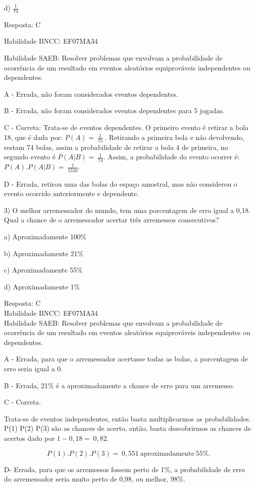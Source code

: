 d) \(\frac{1}{74}\)

Resposta: C

Habilidade BNCC: EF07MA34

Habilidade SAEB: Resolver problemas que envolvam a probabilidade de
ocorrência de um resultado em eventos aleatórios equiprováveis
independentes ou dependentes.

A - Errada, não foram considerados eventos dependentes.

B - Errada, não foram considerados eventos dependentes para 5 jogadas.

C - Correta: Trata-se de eventos dependentes. O primeiro evento é
retirar a bola 18, que é dada por: \(P(A) = \ \frac{1}{75}\ \).
Retirando a primeira bola e não devolvendo, restam 74 bolas, assim a
probabilidade de retirar a bola 4 de primeira, no segundo evento é
\(P(A|B) = \ \frac{1}{74}\). Assim, a probabilidade do evento ocorrer é:
\(P(A).P(A|B) = \ \frac{1}{5550}\).

D - Errada, retirou uma das bolas do espaço amostral, mas não considerou
o evento ocorrido anteriormente e dependente.

3) O melhor arremessador do mundo, tem uma porcentagem de erro igual a
0,18. Qual a chance de o arremessador acertar três arremessos
consecutivos?

a) Aproximadamente 100\%

b) Aproximadamente 21\%

c) Aproximadamente 55\%

d) Aproximadamente 1\%

Resposta: C\\
Habilidade BNCC: EF07MA34\\
Habilidade SAEB: Resolver problemas que envolvam a probabilidade de
ocorrência de um resultado em eventos aleatórios equiprováveis
independentes ou dependentes.

A - Errada, para que o arremessador acertasse todas as bolas, a
porcentagem de erro seria igual a 0.

B - Errada, 21\% é a aproximadamente a chance de erro para um arremesso.

C - Correta.

Trata-se de eventos independentes, então basta multiplicarmos as
probabilidades. P(1) P(2) P(3) são as chances de acerto, então, basta
descobrirmos as chances de acertos dado por \(1 - 0,18 = \ 0,82.\)

\[P(1).P(2).P(3) = \ 0,551\ \text{aproximadamente}\ 55\%.\]

D- Errada, para que os arremessos fossem perto de 1\%, a probabilidade
de erro do arremessador seria muito perto de 0,98, ou melhor, 98\%.

